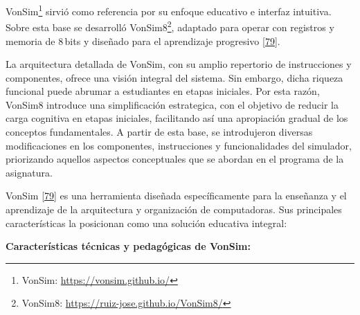 \documentclass[12pt,oneside]{templates/unerthesis}
\begin{document}
VonSim\footnote{VonSim: \url{https://vonsim.github.io/}} sirvió como referencia por su enfoque educativo e interfaz intuitiva. Sobre esta base se desarrolló VonSim8\footnote{VonSim8: \url{https://ruiz-jose.github.io/VonSim8/}}, adaptado para operar con registros y memoria de 8\,bits y diseñado para el aprendizaje progresivo \protect\hyperlink{ref-vonsim}{{[}79{]}}.

La arquitectura detallada de VonSim, con su amplio repertorio de instrucciones y componentes, ofrece una visión integral del sistema. Sin embargo, dicha riqueza funcional puede abrumar a estudiantes en etapas iniciales. Por esta razón, VonSim8 introduce una simplificación estrategica, con el objetivo de reducir la carga cognitiva en etapas iniciales, facilitando así una apropiación gradual de los conceptos fundamentales. A partir de esta base, se introdujeron diversas modificaciones en los componentes, instrucciones y funcionalidades del simulador, priorizando aquellos aspectos conceptuales que se abordan en el programa de la asignatura.

VonSim \protect\hyperlink{ref-vonsim}{{[}79{]}} es una herramienta diseñada específicamente para la enseñanza y el aprendizaje de la arquitectura y organización de computadoras. Sus principales características la posicionan como una solución educativa integral:

\textbf{Características técnicas y pedagógicas de VonSim:}
\end{document}
